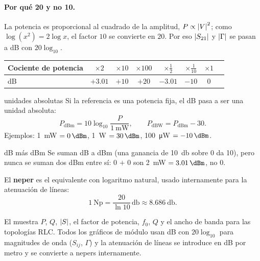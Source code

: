 \paragraph{Por qué 20 y no 10.} La potencia es proporcional al cuadrado de la amplitud, $P \propto \left|V\right|^2$; como
$\log(x^2) = 2\log x$, el factor $10$ se convierte en $20$. Por eso $\left|S_{21}\right|$ y $\left|\Gamma\right|$ se pasan a dB con $20\log_{10}$.

\begin{center}
\begin{tabular}{lccccccc}\toprule
Cociente de potencia & $\times 2$ & $\times 10$ & $\times 100$ & $\times\frac12$ & $\times\frac1{10}$ & $\times 1$ \\ \midrule
dB & $+3.01$ & $+10$ & $+20$ & $-3.01$ & $-10$ & $0$ \\ \bottomrule
\end{tabular}
\end{center}

\begin{definicion}{unidades absolutas}
Si la referencia es una potencia fija, el dB pasa a ser una unidad absoluta:
\begin{equation}
  P_{\mathrm{dBm}} = 10\log_{10}\frac{P}{\SI{1}{\milli\watt}}, \qquad P_{\mathrm{dBW}} = P_{\mathrm{dBm}} - 30 .
\end{equation}
Ejemplos: \SI{1}{\milli\watt} $=\SI{0}{\dBm}$, \SI{1}{\watt} $=\SI{30}{\dBm}$, \SI{100}{\micro\watt} $=\SI{-10}{\dBm}$.
\end{definicion}
\begin{atencion}{dB más dBm}
Se suman dB a dBm (una ganancia de \SI{10}{\decibel} sobre \SI{0}{\dBm} da \SI{10}{\dBm}), pero nunca se suman dos dBm entre sí:
\SI{0}{\dBm} $+$ \SI{0}{\dBm} son \SI{2}{\milli\watt} $=\SI{3.01}{\dBm}$, no \SI{0}{\dBm}.
\end{atencion}

El \textbf{neper} es el equivalente con logaritmo natural, usado internamente para la atenuación de líneas:
\begin{equation}
  \SI{1}{\neper} = \frac{20}{\ln 10}\,\si{\decibel} \approx \SI{8.686}{\decibel}.
\end{equation}

\begin{enlaapp}
El  muestra $P$, $Q$, $\left|S\right|$, el factor de potencia, $f_0$, $Q$ y el ancho de banda para las topologías RLC.
Todos los gráficos de módulo usan dB con $20\log_{10}$ para magnitudes de onda ($S_{ij}$, $\Gamma$) y la atenuación de líneas se
introduce en dB por metro y se convierte a nepers internamente.
\end{enlaapp}
